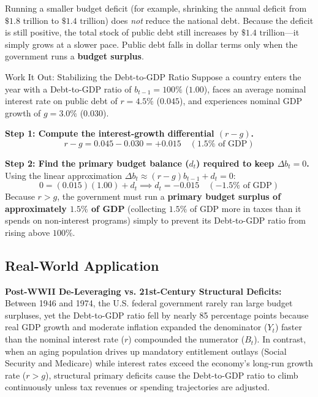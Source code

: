 \documentclass[11pt,letterpaper]{article}
\begin{document}
\begin{coreprinciple}
Running a smaller budget deficit (for example, shrinking the annual deficit from $\$1.8\text{ trillion}$ to $\$1.4\text{ trillion}$) does \emph{not} reduce the national debt. Because the deficit is still positive, the total stock of public debt still increases by $\$1.4\text{ trillion}$---it simply grows at a slower pace. Public debt falls in dollar terms only when the government runs a \textbf{budget surplus}.
\end{coreprinciple}

\begin{examplecase}{Work It Out: Stabilizing the Debt-to-GDP Ratio}
Suppose a country enters the year with a Debt-to-GDP ratio of $b_{t-1} = 100\%$ ($1.00$), faces an average nominal interest rate on public debt of $r = 4.5\%$ ($0.045$), and experiences nominal GDP growth of $g = 3.0\%$ ($0.030$).

\textbf{Step 1: Compute the interest-growth differential $(r - g)$.}
\[
r - g = 0.045 - 0.030 = +0.015 \quad (1.5\% \text{ of GDP})
\]

\textbf{Step 2: Find the primary budget balance ($d_t$) required to keep $\Delta b_t = 0$.}
Using the linear approximation $\Delta b_t \approx (r - g)b_{t-1} + d_t = 0$:
\[
0 = (0.015)(1.00) + d_t \implies d_t = -0.015 \quad (-1.5\% \text{ of GDP})
\]
Because $r > g$, the government must run a \textbf{primary budget surplus of approximately $1.5\%$ of GDP} (collecting $1.5\%$ of GDP more in taxes than it spends on non-interest programs) simply to prevent its Debt-to-GDP ratio from rising above $100\%$.
\end{examplecase}

\subsection*{Real-World Application}
\textbf{Post-WWII De-Leveraging vs. 21st-Century Structural Deficits:} Between 1946 and 1974, the U.S. federal government rarely ran large budget surpluses, yet the Debt-to-GDP ratio fell by nearly 85 percentage points because real GDP growth and moderate inflation expanded the denominator ($Y_t$) faster than the nominal interest rate ($r$) compounded the numerator ($B_t$). In contrast, when an aging population drives up mandatory entitlement outlays (Social Security and Medicare) while interest rates exceed the economy's long-run growth rate ($r > g$), structural primary deficits cause the Debt-to-GDP ratio to climb continuously unless tax revenues or spending trajectories are adjusted.
\end{document}
